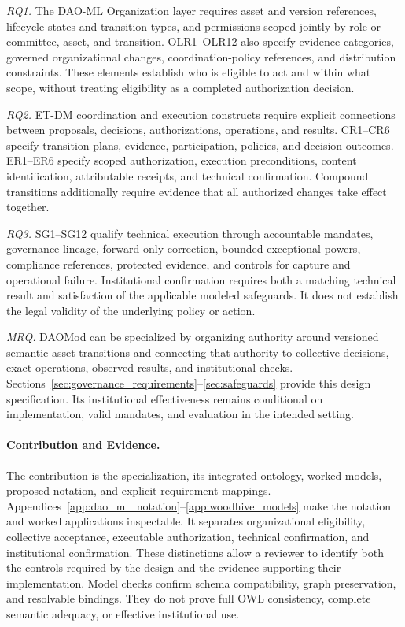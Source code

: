 \documentclass[journal]{IEEEtran}
\begin{document}
\emph{RQ1.}
The DAO-ML Organization layer requires asset and version
references, lifecycle states and transition types, and
permissions scoped jointly by role or committee, asset,
and transition. OLR1--OLR12 also specify evidence categories,
governed organizational changes, coordination-policy references,
and distribution constraints. These elements establish
who is eligible to act and within what scope, without
treating eligibility as a completed authorization decision.

\emph{RQ2.}
ET-DM coordination and execution constructs require explicit
connections between proposals, decisions, authorizations,
operations, and results. CR1--CR6 specify transition plans,
evidence, participation, policies, and decision outcomes.
ER1--ER6 specify scoped authorization, execution preconditions,
content identification, attributable receipts, and technical
confirmation. Compound transitions additionally require
evidence that all authorized changes take effect together.

\emph{RQ3.}
SG1--SG12 qualify technical execution through accountable
mandates, governance lineage, forward-only correction,
bounded exceptional powers, compliance references, protected
evidence, and controls for capture and operational failure.
Institutional confirmation requires both a matching technical
result and satisfaction of the applicable modeled safeguards.
It does not establish the legal validity of the underlying
policy or action.

\emph{MRQ.}
DAOMod can be specialized by organizing authority around
versioned semantic-asset transitions and connecting that
authority to collective decisions, exact operations,
observed results, and institutional checks.
Sections~\ref{sec:governance_requirements}--\ref{sec:safeguards}
provide this design specification. Its institutional
effectiveness remains conditional on implementation,
valid mandates, and evaluation in the intended setting.

\paragraph{Contribution and Evidence.}

The contribution is the specialization, its integrated ontology,
worked models, proposed notation, and explicit requirement
mappings. Appendices~\ref{app:dao_ml_notation}--\ref{app:woodhive_models}
make the notation and worked applications inspectable.
It separates organizational eligibility,
collective acceptance, executable authorization, technical
confirmation, and institutional confirmation. These distinctions
allow a reviewer to identify both the controls required
by the design and the evidence supporting their implementation.
Model checks confirm schema compatibility, graph preservation,
and resolvable bindings. They do not prove full OWL consistency,
complete semantic adequacy, or effective institutional use.
\end{document}
